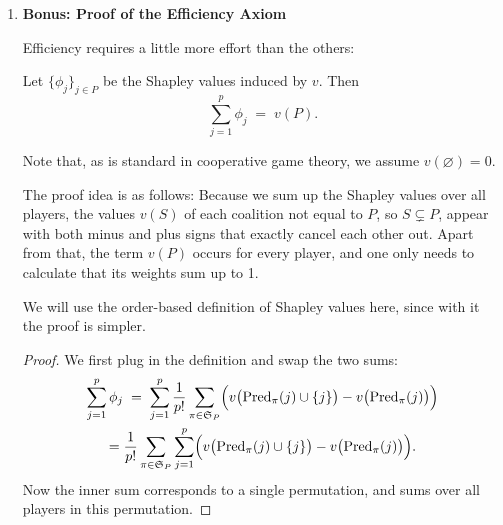 {\begin{enumerate}
\begin{proof}
    \end{proof}

    
    
    \item \textbf{Bonus: Proof of the Efficiency Axiom}
    
    Efficiency requires a little more effort than the others:

    \begin{theorem}[Efficiency]
    Let $\{\phi_j\}_{j \in P}$ be the Shapley values induced by $v$.
    Then
    $$
    \sum_{j=1}^p \phi_j \;=\; v(P).
    $$
    \end{theorem}

    Note that, as is standard in cooperative game theory, we assume $v(\varnothing) = 0$.

    The proof idea is as follows: Because we sum up the Shapley values over all players, the values $v(S)$ of each coalition not equal to $P$, so $S \subsetneq P$, appear with both minus and plus signs that exactly cancel each other out.
    Apart from that, the term $v(P)$ occurs for every player, and one only needs to calculate that its weights sum up to 1.
    
    We will use the order-based definition of Shapley values here, since with it the proof is simpler.

    \begin{proof}
        
        We first plug in the definition and swap the two sums:
        \begin{gather*}
            \sum_{j=1}^p \phi_j 
            \;=\;
            \sum_{j=1}^p \frac{1}{p!} \sum_{\pi \in \mathfrak{S}_P} \Bigl(
                v\bigl( \mathrm{Pred}_\pi(j) \cup \{j\} \bigr)
                - v\bigl( \mathrm{Pred}_\pi(j) \bigr)
            \Bigr) \\
            = \frac{1}{p!} \sum_{\pi \in \mathfrak{S}_P} \sum_{j=1}^p \Bigl(
                v\bigl( \mathrm{Pred}_\pi(j) \cup \{j\} \bigr)
                - v\bigl( \mathrm{Pred}_\pi(j) \bigr)
            \Bigr).
        \end{gather*}
        Now the inner sum corresponds to a single permutation, and sums over all players in this permutation.
        

\end{proof}
\end{enumerate}}
